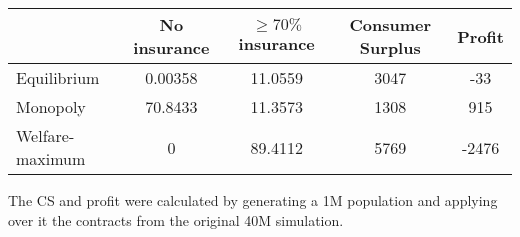 \documentclass[10pt]{article}
\begin{document}
\begin{comment}
\begin{center}
\captionof{table}{Statistics of contracts under normal losses}
\begin{tabular}{|lcccccc|}
\hline
 & No insurance & $\geq 70 \%$ insurance & $\geq 80 \%$ insurance & $\geq 90 \%$ insurance & Consumer Surplus & Profit\\
\hline
Equilibrium & 0.00358 & 11.0559 & 4.0794 & 0.29321 &&\\
Monopoly & 70.8433 & 11.3573 & 5.6985 & 0.3306 && \\
Welfare-maximum & 0 & 89.4112 & 62.8434 & 4.4813 &&\\
\hline
\end{tabular}
\end{center}
\end{comment}

\begin{center}
\begin{tabular}{|lcccc|}
\hline
 & No insurance & $\geq 70 \%$ insurance & Consumer Surplus & Profit\\
\hline
Equilibrium & 0.00358 & 11.0559 & 3047 & -33\\
Monopoly & 70.8433 & 11.3573  & 1308 & 915 \\
Welfare-maximum & 0 & 89.4112 & 5769 & -2476\\
\hline
\end{tabular}
\end{center}

The CS and profit were calculated by generating a 1M population and applying over it the contracts from the original 40M simulation.

\begin{comment}
    \begin{center}
\captionof{table}{Statistics of contracts under truncated normal losses}
\begin{tabular}{|lcccccc|}
\hline
 & No insurance & $\geq 70 \%$ insurance & $\geq 80 \%$ insurance & $\geq 90 \%$ insurance & Consumer Surplus & Profit\\
\hline
Equilibrium & 0.00393 & 5.81 & 2.33 & 0.41 & 5453 & -40\\
Monopoly & 78.27 & 7.87 & 5.16 & 1.10 & 2406 & 1393\\
Welfare-maximum & 0 & 69.37 & 48.91 & 12.93 & 8084 & -2133\\
\hline
\end{tabular}
\end{center}
\end{comment}
\end{document}
